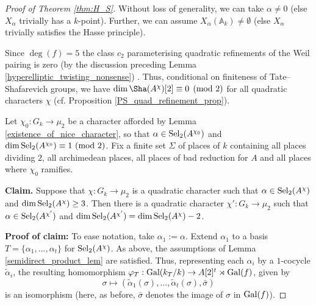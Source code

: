 \documentclass[10pt]{amsart}
\numberwithin{equation}{section}
\theoremstyle{remark}
\theoremstyle{definition}
\theoremstyle{definition}
\theoremstyle{definition}
\theoremstyle{definition}
\theoremstyle{definition}
\theoremstyle{definition}
\theoremstyle{definition}
\theoremstyle{definition}
\begin{document}
 \begin{proof}[Proof of Theorem \ref{thm:H_S}]
 Without loss of generality, we can take $\alpha \neq 0$ (else $X_\alpha$ trivially has a $k$-point). Further, we can assume $X_{\alpha}(\mathbb{A}_k)\neq \emptyset$ (else  $X_\alpha$ trivially satisfies the Hasse principle). %
 
 Since $\deg(f)=5$ the class $c_2$ parameterising quadratic refinements of the Weil pairing is zero (by the discussion preceding Lemma \ref{hyperelliptic_twisting_nonsense}) . Thus, conditional on finiteness of Tate--Shafarevich groups, we have $\dim \Sha(A^{\chi})[2]\equiv 0\pmod 2$ for all quadratic characters $\chi$ (cf. Proposition \ref{PS_quad_refinement_prop}). 
 
Let $\chi_0:G_k\to \mu_2$ be a character afforded by Lemma \ref{existence_of_nice_character}, so that  $\alpha \in \textup{Sel}_2(A^{\chi_0})$ and $\dim \textup{Sel}_2(A^{\chi_0})\equiv 1 ~(\textup{mod }2)$.  Fix a finite set $\Sigma$ of places of $k$ containing all places dividing $2$, all archimedean places,  all places of bad reduction for $A$ and all places where $\chi_0$ ramifies. 
 
 
 
 
 
\textbf{Claim.} Suppose that $\chi:G_k\to \mu_2$ is a quadratic character such that $\alpha \in \textup{Sel}_2(A^\chi)$ and $\dim \textup{Sel}_2(A^\chi)\geq 3$. Then there is a quadratic character $\chi':G_k\to \mu_2$ such that $\alpha \in \textup{Sel}_2(A^{\chi'})$ and $\dim \textup{Sel}_2(A^{\chi'})=\dim \textup{Sel}_2(A^\chi)-2$. 
 

\textbf{Proof of claim:} To ease notation, take $\alpha_1:=\alpha$. Extend $\alpha_1$ to a basis $T=\{\alpha_1,...,\alpha_t\}$ for $\textup{Sel}_2(A^\chi)$. As above,  the assumptions of Lemma \ref{semidirect_product_lem} are satisfied. Thus, representing each $\alpha_i$ by a $1$-cocycle $\widetilde{\alpha}_i$, the resulting homomorphism 
$\varphi_T:\textup{Gal}(k_T/k)\to A[2]^t\rtimes \textup{Gal}(f)$, given by 
\[\sigma \mapsto (\widetilde{\alpha}_1(\sigma),...,\widetilde{\alpha}_t(\sigma),\bar{\sigma})\] is an isomorphism (here, as before, $\bar{\sigma}$ denotes the image of $\sigma$  in $ \textup{Gal}(f)$). 


\end{proof}
\end{document}
